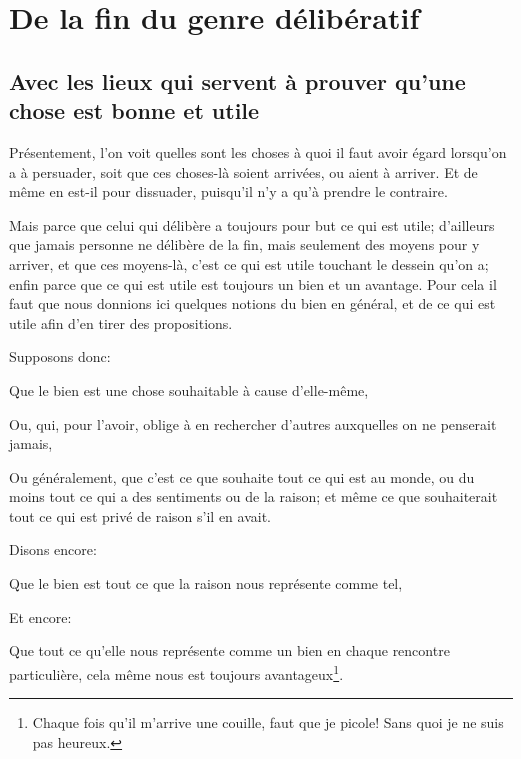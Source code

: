 
\section{De la fin du genre délibératif}
\subsection{Avec les lieux qui servent à prouver qu'une chose est bonne et utile}


Présentement, l'on voit quelles sont les choses à quoi il faut avoir égard lorsqu'on a à persuader, soit que ces choses-là
soient arrivées, ou aient à arriver. Et de même en est-il pour dissuader, puisqu'il n'y a qu'à prendre le contraire. 

Mais parce que celui qui délibère a toujours pour but ce qui est utile; d'ailleurs que jamais personne ne délibère de la
fin, mais seulement des moyens pour y arriver, et que ces moyens-là, c'est ce qui est utile touchant le dessein qu'on a;
enfin parce que ce qui est utile est toujours un bien et un avantage. Pour cela il faut que nous donnions ici quelques
notions du bien en général, et de ce qui est utile afin d'en tirer des propositions.

Supposons donc: 

\begin{emphpar}
     Que le bien est une chose souhaitable à cause d'elle-même,

     Ou, qui, pour l'avoir, oblige à en rechercher d'autres auxquelles on ne penserait jamais,

     Ou généralement, que c'est ce que souhaite tout ce qui est au monde, ou du moins tout ce qui a des sentiments ou de
     la raison; et même ce que souhaiterait tout ce qui est privé de raison s'il en avait.
\end{emphpar}

Disons encore:

\begin{emphpar}
     Que le bien est tout ce que la raison nous représente comme tel,
\end{emphpar}

Et encore:

\begin{emphpar}
     Que tout ce qu'elle nous représente comme un bien en chaque rencontre particulière, cela même nous est toujours
	 avantageux\footnote{Chaque fois qu'il m'arrive une couille, faut que je picole! Sans quoi je ne suis pas heureux.}.
\end{emphpar}

